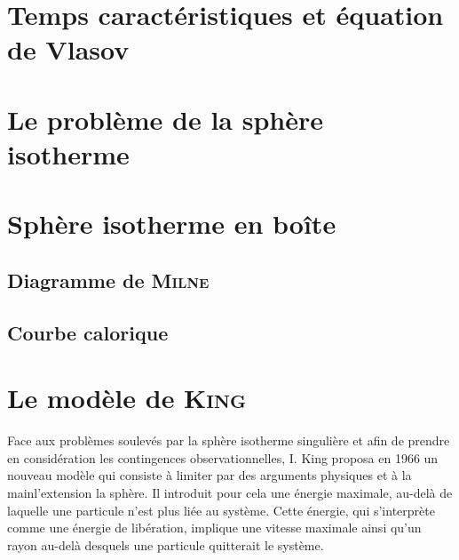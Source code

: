 \chapter{Temps caractéristiques et équation de Vlasov\label{Chap::TempsCarac}}
	\minitoc

	

	

\chapter{Le problème de la sphère isotherme}
		\minitoc
		
		

\chapter{Sphère isotherme en boîte\label{SIB::Chapitre}}
	\minitoc

	\section{Diagramme de \textsc{Milne}}
		

	\section{Courbe calorique}
		

%			

\chapter{Le modèle de \textsc{King}\label{King::Chapitre}}
	\minitoc

	Face aux problèmes soulevés par la sphère isotherme singulière et afin de prendre en considération les contingences observationnelles, I.
	King proposa en 1966 un nouveau modèle qui consiste à limiter par des arguments physiques et \og à la main\fg l'extension la sphère. Il
	introduit pour cela une énergie maximale, au-delà de laquelle une particule n'est plus liée au système. Cette énergie, qui s'interprète comme
	une énergie de libération, implique une vitesse maximale ainsi qu'un rayon au-delà desquels une particule quitterait le système.

